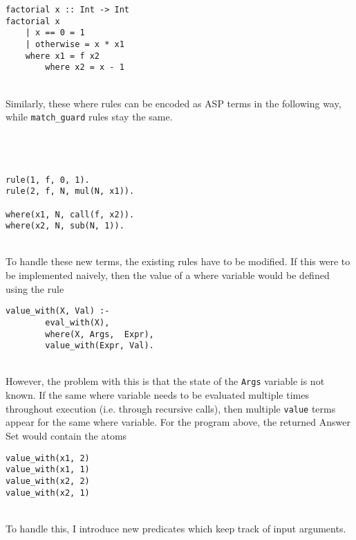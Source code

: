 \begin{lstlisting}
factorial x :: Int -> Int
factorial x 
	| x == 0 = 1
	| otherwise = x * x1
	where x1 = f x2
		where x2 = x - 1
\end{lstlisting}
\mbox{}\\
Similarly, these where rules can be encoded as ASP terms in the following way, while \lstinline!match_guard! rules stay the same.\\ \\
\mbox{}\\
\mbox{}\\

\begin{lstlisting}
rule(1, f, 0, 1).
rule(2, f, N, mul(N, x1)).

where(x1, N, call(f, x2)).
where(x2, N, sub(N, 1)).
\end{lstlisting}
\mbox{}\\
To handle these new terms, the existing rules have to be modified. If this were to be implemented naively, then the value of a where variable would be defined using the rule \\

\begin{lstlisting}
value_with(X, Val) :- 
		eval_with(X), 
		where(X, Args,  Expr), 
		value_with(Expr, Val).
\end{lstlisting}
\mbox{}\\
However, the problem with this is that the state of the \lstinline!Args! variable is not known. If the same where variable needs to be evaluated multiple times throughout execution (i.e. through recursive calls), then multiple \lstinline!value! terms appear for the same where variable. For the program above, the returned Answer Set would contain the atoms \\

\begin{lstlisting}
value_with(x1, 2)
value_with(x1, 1)
value_with(x2, 2)
value_with(x2, 1)
\end{lstlisting}
\mbox{}\\
To handle this, I introduce new predicates which keep track of input arguments.

